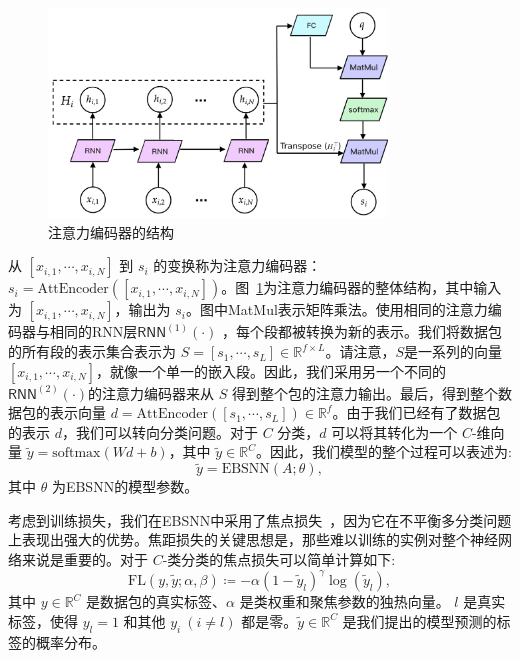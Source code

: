\documentclass[degree=master,cjk-font=noto]{thuthesis}
\begin{document}
\begin{figure}[!tp]
	\centerline{\includegraphics[width=9.0cm]{EBSNN_attention.png}}
	\caption{注意力编码器的结构}
	\label{fig_attention}
\end{figure}


从 $[x_{i,1}, \cdots, x_{i,N}]$ 到 $s_i$ 的变换称为注意力编码器：$s_i = \text{AttEncoder}([x_{i,1}, \cdots, x_{i,N}])$。图~\ref{fig_attention}为注意力编码器的整体结构，其中输入为 $[x_{i,1}, \cdots, x_{i,N}]$，输出为 $s_i$。图中MatMul表示矩阵乘法。使用相同的注意力编码器与相同的RNN层$\textsf{RNN}^{(1)}(\cdot)$ ，每个段都被转换为新的表示。我们将数据包的所有段的表示集合表示为 $S = [s_1, \cdots, s_L] \in \mathbb{R}^{f \times L}$。请注意，$S$是一系列的向量$[x_{i,1}, \cdots, x_{i,N}]$，就像一个单一的嵌入段。因此，我们采用另一个不同的$\textsf{RNN}^{(2)}(\cdot)$的注意力编码器来从 $S$ 得到整个包的注意力输出。最后，得到整个数据包的表示向量 $d = \text{AttEncoder}([s_1, \cdots, s_L]) \in \mathbb{R}^f$。由于我们已经有了数据包的表示 $d$，我们可以转向分类问题。对于 $C$ 分类，$d$ 可以将其转化为一个 $C$-维向量 $\tilde{y}= \text{softmax}(Wd+b)$，其中 $\tilde{y} \in \mathbb{R}^C$。因此，我们模型的整个过程可以表述为:
\begin{equation}
	\tilde{y} = \text{EBSNN}(A; \theta),
\end{equation}
其中 $\theta$ 为EBSNN的模型参数。

考虑到训练损失，我们在EBSNN中采用了焦点损失~\cite{8417976}，因为它在不平衡多分类问题上表现出强大的优势。焦距损失的关键思想是，那些难以训练的实例对整个神经网络来说是重要的。对于 $C$-类分类的焦点损失可以简单计算如下:
\begin{equation}
	\text{FL}(y, \tilde{y}; \alpha, \beta) \coloneqq -\alpha(1 - \tilde{y}_l)^\gamma \log(\tilde{y}_l),
\end{equation}
其中 $y \in \mathbb{R}^C$ 是数据包的真实标签、$\alpha$ 是类权重和聚焦参数的独热向量。 $l$ 是真实标签，使得 $y_l = 1$ 和其他 $y_i \ (i \ne l)$ 都是零。$\tilde{y} \in \mathbb{R}^C$ 是我们提出的模型预测的标签的概率分布。
\end{document}
